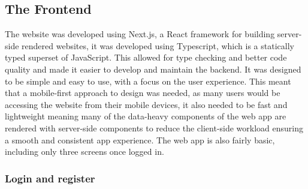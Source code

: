 \subsection{The Frontend}
The website was developed using Next.js, a React framework for building server-side rendered websites, it was developed using Typescript, which is a statically typed superset of JavaScript. This allowed for type checking and better code quality and made it easier to develop and maintain the backend. It was designed to be simple and easy to use, with a focus on the user experience. This meant that a mobile-first approach to design was needed, as many users would be accessing the website from their mobile devices, it also needed to be fast and lightweight meaning many of the data-heavy components of the web app are rendered with server-side components to reduce the client-side workload ensuring a smooth and consistent app experience. The web app is also fairly basic, including only three screens once logged in.
\subsubsection{Login and register}

